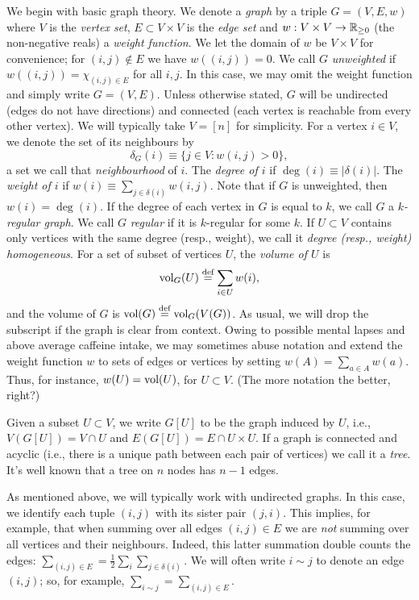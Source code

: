 We begin with basic graph theory. 
We denote a \emph{graph} by a triple $G=(V,E,w)$ where $V$ is the \emph{vertex set}, $E\subset V\times V$ is the \emph{edge set} and $w:V\times V\to\mathbb{R}_{\geq0}$ (the non-negative reals) a \emph{weight function}. We let the domain of $w$ be $V\times V$ for convenience; for $(i,j)\notin E$ we have $w((i,j))=0$. We call $G$ \emph{unweighted} if $w((i,j))=\chi_{(i,j)\in E}$ for all $i,j$. In this case, we may omit the weight function and simply write $G=(V,E)$. 
Unless otherwise stated, $G$ will be undirected (edges do not have  directions) and connected (each vertex is reachable from every other vertex). 
We will typically take $V=[n]$ for simplicity. For a  vertex $i\in V$, we denote the set of its neighbours by 
\begin{equation}
\label{eq:delta(i)}
\delta_G(i) \equiv  \{j\in V:w(i,j)>0\},
\end{equation}
a set we call that \emph{neighbourhood} of $i$. The \emph{degree of $i$} if $\deg(i)\equiv |\delta(i)|$. The \emph{weight of $i$} if $w(i)\equiv \sum_{j\in \delta(i)}w(i,j)$. Note that if $G$ is unweighted, then $w(i)=\deg(i)$. If the degree of each vertex in $G$ is equal to $k$, we call $G$ a \emph{$k$-regular graph}. We call $G$ \emph{regular} if it is $k$-regular for some $k$. If $U\subset V$ contains only vertices with the same degree (resp., weight), we call it \emph{degree (resp., weight) homogeneous}. 
For a set of subset of vertices $U$, the \emph{volume of $U$} is 
\begin{equation}
\label{eq:volU}
\textnormal{vol}_G(U) \overset{\text{def}}{=} \sum_{i\in U}w(i),
\end{equation}
and the volume of $G$ is $\textnormal{vol}(G) \overset{\text{def}}{=} \textnormal{vol}_G(V(G))$. As usual, we will drop the subscript if the graph is clear from context. 
Owing to possible mental lapses and above average caffeine intake, we may sometimes abuse notation and extend the weight function $w$ to sets of edges or vertices by setting $w(A)=\sum_{a\in A}w(a)$. Thus, for instance, $w(U) = \textnormal{vol}(U)$, for $U\subset V$. (The more notation the better, right?) 

Given a subset $U\subset  V$, we write $G[U]$ to be the graph induced by $U$, i.e., $V(G[U])  = V\cap U$ and  $E(G[U]) = E \cap U \times U$. If a graph is connected  and acyclic (i.e., there is a unique path between each pair of vertices) we call it a \emph{tree}. It's well known that a tree on $n$ nodes has $n-1$ edges.  

As mentioned above, we will typically  work  with undirected graphs. In this case, we identify each tuple $(i,j)$ with its sister pair $(j,i)$. This implies, for example, that when summing over all edges $(i,j)\in E$ we are \emph{not} summing over all vertices and their neighbours. Indeed, this latter summation double counts the edges: $\sum_{(i,j)\in E}=\frac{1}{2}\sum_{i}\sum_{j\in\delta(i)}$. We will often write $i\sim j$ to denote an edge $(i,j)$; so, for example, $\sum_{i\sim j}=\sum_{(i,j)\in E}$. 

